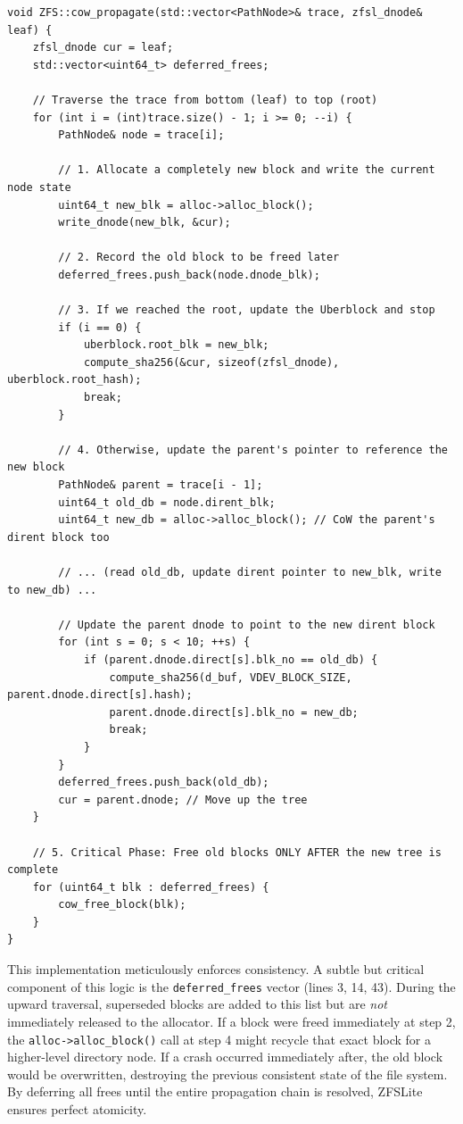 \documentclass[pdflatex,sn-mathphys-num]{sn-jnl}
\begin{document}
\begin{lstlisting}[caption={The Copy-on-Write propagation engine.}, label={lst:cow}]
void ZFS::cow_propagate(std::vector<PathNode>& trace, zfsl_dnode& leaf) {
    zfsl_dnode cur = leaf;
    std::vector<uint64_t> deferred_frees;

    // Traverse the trace from bottom (leaf) to top (root)
    for (int i = (int)trace.size() - 1; i >= 0; --i) {
        PathNode& node = trace[i];

        // 1. Allocate a completely new block and write the current node state
        uint64_t new_blk = alloc->alloc_block();
        write_dnode(new_blk, &cur);
        
        // 2. Record the old block to be freed later
        deferred_frees.push_back(node.dnode_blk);

        // 3. If we reached the root, update the Uberblock and stop
        if (i == 0) {
            uberblock.root_blk = new_blk;
            compute_sha256(&cur, sizeof(zfsl_dnode), uberblock.root_hash);
            break;
        }

        // 4. Otherwise, update the parent's pointer to reference the new block
        PathNode& parent = trace[i - 1];
        uint64_t old_db = node.dirent_blk;
        uint64_t new_db = alloc->alloc_block(); // CoW the parent's dirent block too
        
        // ... (read old_db, update dirent pointer to new_blk, write to new_db) ...
        
        // Update the parent dnode to point to the new dirent block
        for (int s = 0; s < 10; ++s) {
            if (parent.dnode.direct[s].blk_no == old_db) {
                compute_sha256(d_buf, VDEV_BLOCK_SIZE, parent.dnode.direct[s].hash);
                parent.dnode.direct[s].blk_no = new_db;
                break;
            }
        }
        deferred_frees.push_back(old_db);
        cur = parent.dnode; // Move up the tree
    }

    // 5. Critical Phase: Free old blocks ONLY AFTER the new tree is complete
    for (uint64_t blk : deferred_frees) {
        cow_free_block(blk);
    }
}
\end{lstlisting}

This implementation meticulously enforces consistency. A subtle but critical component of this logic is the \verb+deferred_frees+ vector (lines 3, 14, 43). During the upward traversal, superseded blocks are added to this list but are \textit{not} immediately released to the allocator. If a block were freed immediately at step 2, the \verb+alloc->alloc_block()+ call at step 4 might recycle that exact block for a higher-level directory node. If a crash occurred immediately after, the old block would be overwritten, destroying the previous consistent state of the file system. By deferring all frees until the entire propagation chain is resolved, ZFSLite ensures perfect atomicity.
\end{document}
